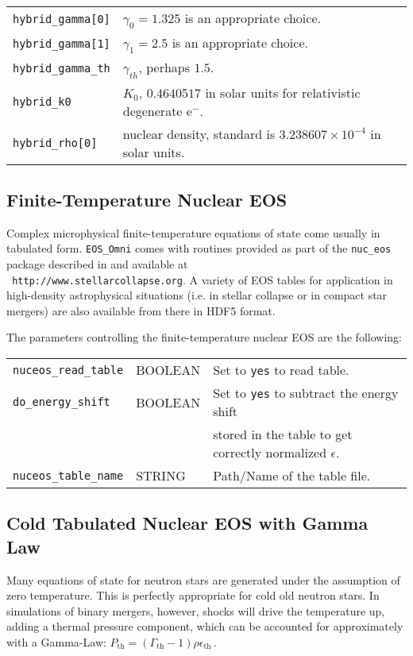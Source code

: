 \begin{tabular}{ll}
\texttt{hybrid\_gamma[0]}   & $\gamma_0 = 1.325$ is an appropriate choice.\\
\texttt{hybrid\_gamma[1]}   & $\gamma_1 = 2.5$ is an appropriate choice.\\
\texttt{hybrid\_gamma\_th}  & $\gamma_{th}$, perhaps $1.5$.\\
\texttt{hybrid\_k0}         & $K_0$, $0.4640517$ in solar units for
                              relativistic degenerate e$^{-}$.\\
\texttt{hybrid\_rho[0]}     & nuclear density, standard is $3.238607\times
                              10^{-4}$ in solar units.
\end{tabular}


\subsection{Finite-Temperature Nuclear EOS}

Complex microphysical finite-temperature equations of state come
usually in tabulated form. {\tt EOS\_Omni} comes with routines
provided as part of the \texttt{nuc\_eos} package described in
\cite{oconnor:10} and available at \\ {\tt
  http://www.stellarcollapse.org}. A variety of EOS tables for
application in high-density astrophysical situations (i.e. in stellar
collapse or in compact star mergers) are also available from there
in HDF5 format.

The parameters controlling the finite-temperature nuclear EOS
are the following:

\begin{tabular}{lll}
\texttt{nuceos\_read\_table}& BOOLEAN & Set to {\tt yes} to read table.\\
\texttt{do\_energy\_shift}& BOOLEAN & Set to {\tt yes} to subtract the energy shift\\ 
&& stored in the table to get correctly normalized $\epsilon$.\\
\texttt{nuceos\_table\_name}& STRING & Path/Name of the table file.
\end{tabular}

\subsection{Cold Tabulated Nuclear EOS with Gamma Law}

Many equations of state for neutron stars are generated under the
assumption of zero temperature. This is perfectly appropriate for cold
old neutron stars. In simulations of binary mergers, however, shocks
will drive the temperature up, adding a thermal pressure component,
which can be accounted for approximately with a Gamma-Law:
$P_\mathrm{th} = (\Gamma_\mathrm{th} - 1)\rho\epsilon_\mathrm{th}$\,.

